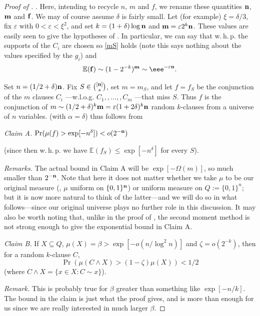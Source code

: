 \documentclass{toc}
\newcommand{\nn}[0]{{\bf n}}
\newcommand{\mm}[0]{{\bf m}}
\newcommand{\beq}[1]{\begin{equation}\label{#1}}
\newcommand{\enq}[0]{\end{equation}}
\newcommand{\mn}[0]{\medskip\noindent}
\newcommand{\sub}[0]{\subseteq}
\renewcommand{\dots}[0]{,\ldots,}
\newcommand{\ff}[0]{{\bf f}}
\newcommand{\0}[0]{\emptyset}
\newcommand{\ga}[0]{\alpha }
\newcommand{\gb}[0]{\beta }
\newcommand{\gd}[0]{\delta }
\newcommand{\gO}[0]{\Omega}
\newcommand{\gz}[0]{\zeta}
\newcommand{\eps}[0]{\varepsilon }
\begin{document}
\mn
%
%
\begin{proof}[Proof of ].   %
Here, intending to recycle $n$, $m$ and $f$, we rename
these quantities
$\nn$, $\mm$ and $\ff$.
We may of course assume $\gd$ is fairly small.
Let (for example) $\xi = \gd/3$, fix $\eps$ with
$0<\eps < \xi^2$, and set
$k=(1+\gd)\log \nn$ and $\mm = \eps 2^k \nn$.
These values are easily seen to give the hypotheses of
 .
In particular, we can say that w.\,h.\,p.
the supports of the %
$C_i$  %
are chosen so \eqref{mS} holds
(note this says nothing about the values specified by
%
the $g_i$) %
and
\beq{mS'}
\mathbb E (\ff)\sim (1-2^{-k})^\mm\sim \eee^{-\eps \nn}.
\enq




Set $n=(1/2+\gd) \nn$.
Fix %
$S\in \binom{[\nn]}{s}$, %
set $m=m_S$,
and
let $f=f_S$ be the %
conjunction  %
of the $m$ %
clauses $C_i$%
---w.l.o.g. %
$C_1,\dots, C_m$%
---that miss $S$.
Thus $f$ is the %
conjunction of %
$m\sim (1/2+\gd)^k\mm =\eps (1+2\gd)^k\nn$
random $k$-clauses from a universe of $n$ variables.
 (with $\ga=\gd$) thus follows from

\mn
\emph{Claim A.}
$\Pr(\mu(f)  > \exp[-n^{\gd}]) < o(2^{-\nn})$

\mn
(since then w.\,h.\,p. we have $\mathbb E (f_S)\leq \exp[-n^{\gd}]$ for every $S$).


\mn
\emph{Remarks.}
The actual bound in Claim A will be
$\exp[-\gO(m)]$,
so much smaller than $2^{-\nn}$.
Note that here it %
does not %
matter whether we take $\mu$ to be
our original measure (\ie, $\mu$ uniform on $\{0,1\}^\nn$)
or uniform measure on $Q:=\{0,1\}^n$;
but it is %
now more natural to think of
the latter---and we will do so in what follows---since
our original universe plays no further role in this discussion.
It may also be worth noting that, unlike in the proof of
, the second moment method is not strong
enough to give the exponential bound in Claim A.




\mn
\emph{Claim B.}
If $X\sub Q$,
$\mu (X) =\gb> \exp[-o(n/\log^2n)]$ and $\gz =o(2^{-k})$,
then for a random $k$-clause $C$,
$$
\Pr(\mu (C\wedge X) >(1-\gz)\mu (X)) < 1/2
$$
(where $C\wedge X =\{x\in X: C\sim x\}$).


\mn
\emph{Remark.}  This is probably true for
$\gb$ greater than something like $\exp[-n/k]$.
The bound in the claim
is just what the proof gives, and is more than enough
for us since %
we are %
really interested in much larger $\gb$.



\end{proof}
\end{document}
